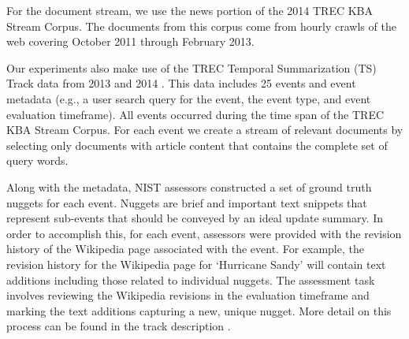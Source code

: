 For the document stream, we use the news portion of the
 2014 TREC KBA Stream Corpus.
The documents from this corpus come from hourly crawls of the web covering 
 October 2011 through February 2013. 


Our experiments also make use of the TREC Temporal Summarization (TS) Track
 data from 2013 and 2014 \cite{aslam2013trec}. 
This data includes 25 events and event metadata (e.g., a user
search query for the event, the event type, and event evaluation timeframe).  
All events occurred during the time span of the TREC KBA Stream Corpus.
For each event we create a stream of relevant documents by 
selecting only documents with article content that contains the complete set 
of query words. 

Along with the metadata, NIST assessors constructed a set of ground truth nuggets for each event. 
Nuggets are brief and important text snippets that represent sub-events that should be conveyed
by an ideal update summary. %
In order
to accomplish this, for each event, assessors were provided with the
revision history of the Wikipedia page associated with the event.  
For example, 
the revision history for the Wikipedia page for `Hurricane Sandy' will 
contain text additions including those related to individual nuggets.  The assessment
task involves reviewing the Wikipedia revisions in the evaluation timeframe 
and marking the text additions capturing a new, unique nugget.  More detail
on this process can be found in the track description \cite{aslam2013trec}.


